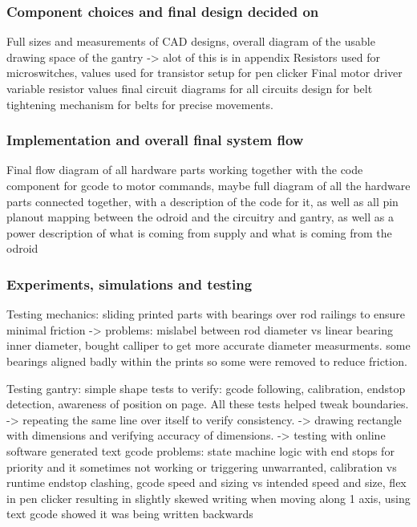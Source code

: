 \subsubsection{Component choices and final design decided on}
Full sizes and measurements of CAD designs, overall diagram of the usable drawing space of the gantry -> alot of this is in appendix
Resistors used for microswitches, values used for transistor setup for pen clicker
Final motor driver variable resistor values
final circuit diagrams for all circuits
design for belt tightening mechanism for belts for precise movements.

\subsubsection{Implementation and overall final system flow}
Final flow diagram of all hardware parts working together with the code component for gcode to motor commands, maybe full diagram of all the hardware parts connected together, with a description of the code for it, as well as all pin planout mapping between the odroid and the circuitry and gantry, as well as a power description of what is coming from supply and what is coming from the odroid

\subsubsection{Experiments, simulations and testing}
Testing mechanics: sliding printed parts with bearings over rod railings to ensure minimal friction -> problems: mislabel between rod diameter vs linear bearing inner diameter, bought calliper to get more accurate diameter measurments. some bearings aligned badly within the prints so some were removed to reduce friction.

Testing gantry: simple shape tests to verify: gcode following, calibration, endstop detection, awareness of position on page. All these tests helped tweak boundaries.
-> repeating the same line over itself to verify consistency.
-> drawing rectangle with dimensions and verifying accuracy of dimensions.
-> testing with online software generated text gcode
problems: state machine logic with end stops for priority and it sometimes not working or triggering unwarranted, calibration vs runtime endstop clashing, gcode speed and sizing vs intended speed and size, flex in pen clicker resulting in slightly skewed writing when moving along 1 axis, using text gcode showed it was being written backwards

